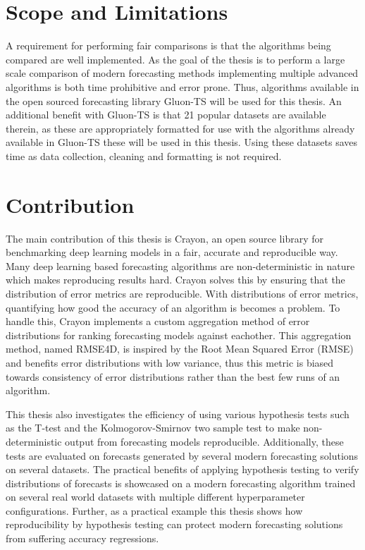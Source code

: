 \section{Scope and Limitations}
A requirement for performing fair comparisons is that the algorithms being compared are well implemented. As the goal of the thesis is to perform a large scale comparison of modern forecasting methods implementing multiple advanced algorithms is both time prohibitive and error prone. Thus, algorithms available in the open sourced forecasting library Gluon-TS will be used for this thesis. An additional benefit with Gluon-TS is that 21 popular datasets are available therein, as these are appropriately formatted for use with the algorithms already available in Gluon-TS these will be used in this thesis. Using these datasets saves time as data collection, cleaning and formatting is not required.

\section{Contribution}
\label{section:contribution}

The main contribution of this thesis is Crayon, an open source library for benchmarking deep learning models in a fair, accurate and reproducible way. Many deep learning based forecasting algorithms are non-deterministic in nature which makes reproducing results hard. Crayon solves this by ensuring that the distribution of error metrics are reproducible. With distributions of error metrics, quantifying how good the accuracy of an algorithm is becomes a problem. To handle this, Crayon implements a custom aggregation method of error distributions for ranking forecasting models against eachother. This aggregation method, named RMSE4D, is inspired by the Root Mean Squared Error (RMSE) \cite{hyndman_forecasting_3rd} and benefits error distributions with low variance, thus this metric is biased towards consistency of error distributions rather than the best few runs of an algorithm.

This thesis also investigates the efficiency of using various hypothesis tests such as the T-test \cite{student_or_welch} and the Kolmogorov-Smirnov two sample test \cite{massey1951kolmogorov} to make non-deterministic output from forecasting models reproducible. Additionally, these tests are evaluated on forecasts generated by several modern forecasting solutions on several datasets. The practical benefits of applying hypothesis testing to verify distributions of forecasts is showcased on a modern forecasting algorithm trained on several real world datasets with multiple different hyperparameter configurations. Further, as a practical example this thesis shows how reproducibility by hypothesis testing can protect modern forecasting solutions from suffering accuracy regressions.


